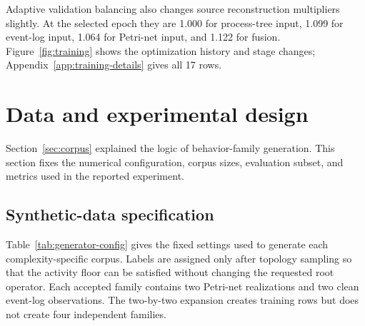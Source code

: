 \documentclass[pdflatex,sn-basic]{sn-jnl}
\begin{document}
Adaptive validation balancing also changes source reconstruction multipliers slightly. At the selected epoch they are 1.000 for process-tree input, 1.099 for event-log input, 1.064 for Petri-net input, and 1.122 for fusion. Figure~\ref{fig:training} shows the optimization history and stage changes; Appendix~\ref{app:training-details} gives all 17 rows.



\FloatBarrier
\section{Data and experimental design}\label{sec:experiment}

Section~\ref{sec:corpus} explained the logic of behavior-family generation. This section fixes the numerical configuration, corpus sizes, evaluation subset, and metrics used in the reported experiment.

\subsection{Synthetic-data specification}\label{sec:data-specification}

Table~\ref{tab:generator-config} gives the fixed settings used to generate each complexity-specific corpus. Labels are assigned only after topology sampling so that the activity floor can be satisfied without changing the requested root operator. Each accepted family contains two Petri-net realizations and two clean event-log observations. The two-by-two expansion creates training rows but does not create four independent families.
\end{document}

